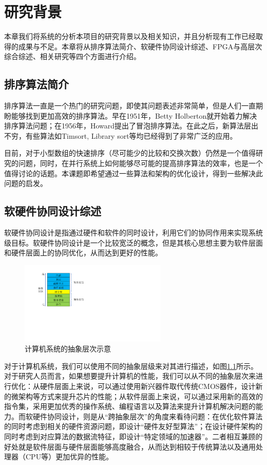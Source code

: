 
\chapter{研究背景}
本章我们将系统的分析本项目的研究背景以及相关知识，并且分析现有工作已经取得的成果与不足。本章将从排序算法简介、软硬件协同设计综述、FPGA与高层次综合综述、相关研究等四个方面进行介绍。
\section{排序算法简介}

排序算法一直是一个热门的研究问题，即使其问题表述非常简单，但是人们一直期盼能够找到更加高效的排序算法。早在1951年，Betty Holberton就开始着力解决排序算法问题；在1956年，Howard提出了冒泡排序算法\cite{demuth1956report}。在此之后，新算法层出不穷，有些算法如Timsort\cite{mcilroy1993optimistic}, Library sort\cite{bender2006insertion}等均已经得到了非常广泛的应用。

目前，对于小型数组的快速排序（尽可能少的比较和交换次数）仍然是一个值得研究的问题，同时，在并行系统上如何能够尽可能的提高排序算法的效率，也是一个值得讨论的话题。本课题即希望通过一些算法和架构的优化设计，得到一些解决此问题的启发。


\section{软硬件协同设计综述}
软硬件协同设计是指通过硬件和软件的同时设计，利用它们的协同作用来实现系统级目标\cite{de1997hardware}。软硬件协同设计是一个比较宽泛的概念，但是其核心思想主要为软件层面和硬件层面上的协同优化，从而达到更好的性能。

\begin{figure}[htbp]
    \centering
    \includegraphics[width=7cm]{figures/computer_system_abstract.pdf}
    \caption{计算机系统的抽象层次示意}
    \label{fig:computer_system_abstract}
\end{figure}
对于计算机系统，我们可以使用不同的抽象层级来对其进行描述，如图\ref{fig:computer_system_abstract}所示。对于研究人员而言，如果想要提升计算机的性能，我们可以从不同的抽象层次来进行优化：从硬件层面上来说，可以通过使用新兴器件取代传统CMOS器件，设计新的微架构等方式来提升芯片的性能；从软件层面上来说，可以通过采用新的高效的指令集，采用更加优秀的操作系统、编程语言以及算法来提升计算机解决问题的能力。而软硬件协同设计，则是从“跨抽象层次”的角度来看待问题：在优化软件算法的同时考虑到相关的硬件资源问题，即设计“硬件友好型算法”；在设计硬件架构的同时考虑到对应算法的数据流特征，即设计“特定领域的加速器”。二者相互兼顾的好处就是软件层面与硬件层面能够高度融合，从而达到相较于传统算法以及通用处理器（CPU等）更加优异的性能。

